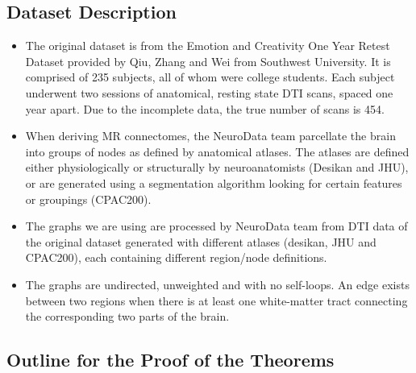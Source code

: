 \documentclass[a4paper]{article}
\begin{document}
\subsection{Dataset Description}
\begin{itemize}
\item The original dataset is from the Emotion and Creativity One Year Retest Dataset provided by Qiu, Zhang and Wei from Southwest University. It is comprised of 235 subjects, all of whom were college students. Each subject underwent two sessions of anatomical, resting state DTI scans, spaced one year apart. Due to the incomplete data, the true number of scans is 454.
\item When deriving MR connectomes, the NeuroData team parcellate the brain into groups of nodes as defined by anatomical atlases. The atlases are defined either physiologically or structurally by neuroanatomists (Desikan and JHU), or are generated using a segmentation algorithm looking for certain features or groupings (CPAC200).
\item The graphs we are using are processed by NeuroData team from DTI data of the original dataset generated with different atlases (desikan, JHU and CPAC200), each containing different region/node definitions.
\item The graphs are undirected, unweighted and with no self-loops. An edge exists between two regions when there is at least one white-matter tract connecting the corresponding two parts of the brain.
\end{itemize}

\subsection{Outline for the Proof of the Theorems}



{}

\end{document}
